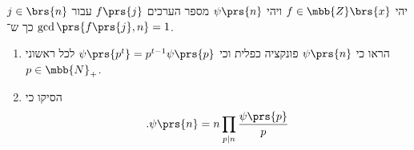 \documentclass[a4paper,10pt,twoside,openany]{book}
\begin{document}
\begin{exercisechap}
יהי
$f \in \mbb{Z}\brs{x}$
ויהי
$\psi\prs{n}$
מספר הערכים
$f\prs{j}$
עבור
$j \in \brs{n}$
כך ש־%
$\gcd\prs{f\prs{j},n} = 1$.

\begin{enumerate}[label = (\alph*)]
\item הראו כי
$\psi\prs{n}$
פונקציה כפלית וכי
$\psi\prs{p^t} = p^{t-1} \psi\prs{p}$
לכל ראשוני
$p \in \mbb{N}_+$.

\item הסיקו כי
\[\text{.} \psi\prs{n} = n \prod_{p \mid n} \frac{\psi\prs{p}}{p}\]
\end{enumerate}

\end{exercisechap}

\begin{solution}
\end{solution}

\printbibliography
\end{document}
